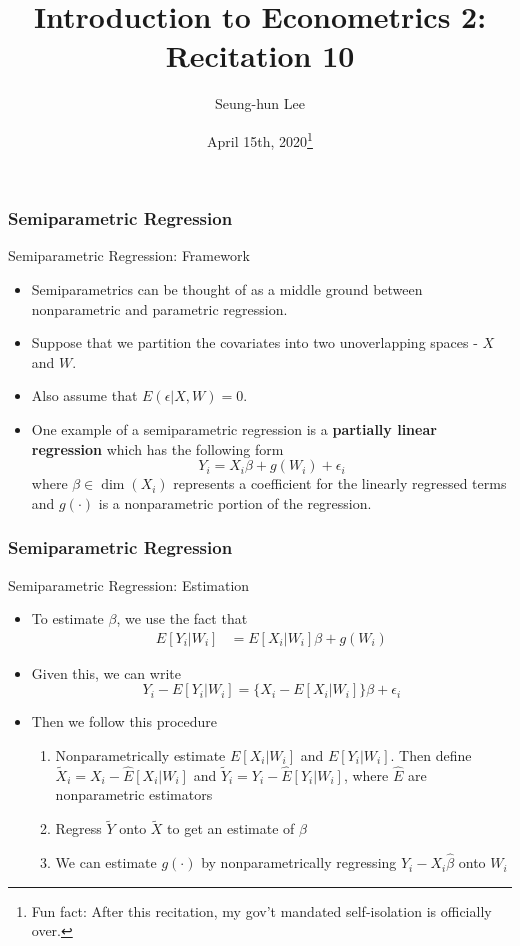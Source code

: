 \documentclass{beamer}
\title[Econometrics 2]{Introduction to Econometrics 2: Recitation 10} %
\author{Seung-hun Lee}
\institute{Columbia University}
\date{April 15th, 2020\footnote{Fun fact: After this recitation, my gov't mandated self-isolation is officially over.}}
\begin{document}
\begin{frame}
\titlepage
\end{frame}

\begin{frame}
\frametitle{Semiparametric Regression}
Semiparametric Regression: Framework
\begin{itemize}
\item Semiparametrics can be thought of as a middle ground between nonparametric and parametric regression.
\item Suppose that we partition the covariates into two unoverlapping spaces - $X$ and $W$. 
\item Also assume that $E(\epsilon|X,W)=0$. 
\item One example of a semiparametric regression is a \textbf{partially linear regression} which has the following form
\[
Y_i = X_i\beta + g(W_i)+\epsilon_i 
\]
where $\beta\in\dim{(X_i)} $ represents a coefficient for the linearly regressed terms and $g(\cdot)$ is a nonparametric portion of the regression.
\end{itemize}
\end{frame}

\begin{frame}
\frametitle{Semiparametric Regression}
Semiparametric Regression: Estimation
\begin{itemize}
\item To estimate $\beta$, we use the fact that
\begin{align*}
E[Y_i|W_i]& = E[X_i|W_i]\beta +g(W_i)
\end{align*}\par
\item Given this, we can write
\[
Y_i-E[Y_i|W_i]=\{X_i-E[X_i|W_i]\}\beta +\epsilon_i
\]\par
\item Then we follow this procedure
\begin{enumerate}
\item Nonparametrically estimate $E[X_i|W_i]$ and $E[Y_i|W_i]$. Then define $\tilde{X}_i=X_i-\widehat{E}[X_i|W_i]$ and $\tilde{Y}_i = Y_i-\widehat{E}[Y_i|W_i]$, where $\widehat{E}$ are nonparametric estimators
\item Regress $\tilde{Y}$ onto $\tilde{X}$ to get an estimate of $\beta$
\item We can estimate $g(\cdot)$ by nonparametrically regressing $Y_i-X_i\hat{\beta}$ onto $W_i$
\end{enumerate}
\end{itemize}
\end{frame}
\end{document}
